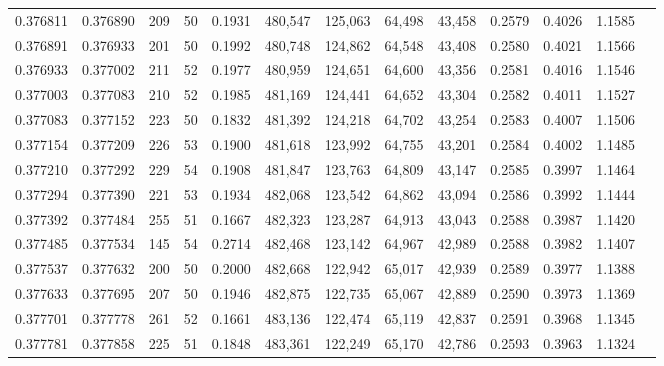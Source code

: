 \begin{tabular}{rrrrrrrrrrrrr}
0.376811 & 0.376890 &   209 &  50 &                                     0.1931 & 480,547 & 125,063 &  64,498 &  43,458 & 0.2579 & 0.4026 & 1.1585 \\
0.376891 & 0.376933 &   201 &  50 &                                     0.1992 & 480,748 & 124,862 &  64,548 &  43,408 & 0.2580 & 0.4021 & 1.1566 \\
0.376933 & 0.377002 &   211 &  52 &                                     0.1977 & 480,959 & 124,651 &  64,600 &  43,356 & 0.2581 & 0.4016 & 1.1546 \\
0.377003 & 0.377083 &   210 &  52 &                                     0.1985 & 481,169 & 124,441 &  64,652 &  43,304 & 0.2582 & 0.4011 & 1.1527 \\
0.377083 & 0.377152 &   223 &  50 &                                     0.1832 & 481,392 & 124,218 &  64,702 &  43,254 & 0.2583 & 0.4007 & 1.1506 \\
0.377154 & 0.377209 &   226 &  53 &                                     0.1900 & 481,618 & 123,992 &  64,755 &  43,201 & 0.2584 & 0.4002 & 1.1485 \\
0.377210 & 0.377292 &   229 &  54 &                                     0.1908 & 481,847 & 123,763 &  64,809 &  43,147 & 0.2585 & 0.3997 & 1.1464 \\
0.377294 & 0.377390 &   221 &  53 &                                     0.1934 & 482,068 & 123,542 &  64,862 &  43,094 & 0.2586 & 0.3992 & 1.1444 \\
0.377392 & 0.377484 &   255 &  51 &                                     0.1667 & 482,323 & 123,287 &  64,913 &  43,043 & 0.2588 & 0.3987 & 1.1420 \\
0.377485 & 0.377534 &   145 &  54 &                                     0.2714 & 482,468 & 123,142 &  64,967 &  42,989 & 0.2588 & 0.3982 & 1.1407 \\
0.377537 & 0.377632 &   200 &  50 &                                     0.2000 & 482,668 & 122,942 &  65,017 &  42,939 & 0.2589 & 0.3977 & 1.1388 \\
0.377633 & 0.377695 &   207 &  50 &                                     0.1946 & 482,875 & 122,735 &  65,067 &  42,889 & 0.2590 & 0.3973 & 1.1369 \\
0.377701 & 0.377778 &   261 &  52 &                                     0.1661 & 483,136 & 122,474 &  65,119 &  42,837 & 0.2591 & 0.3968 & 1.1345 \\
0.377781 & 0.377858 &   225 &  51 &                                     0.1848 & 483,361 & 122,249 &  65,170 &  42,786 & 0.2593 & 0.3963 & 1.1324 \\

\end{tabular}
